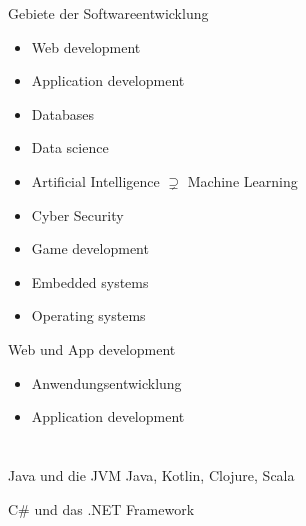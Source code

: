 \begin{frame}{Gebiete der Softwareentwicklung}
    \begin{itemize}
        \item Web development
        \item Application development
        \item Databases
        \item Data science
        \item Artificial Intelligence $\supsetneq$ Machine Learning
        \item Cyber Security
        \item Game development
        \item Embedded systems
        \item Operating systems
    \end{itemize}

\end{frame}

\begin{frame}{Web und App development}
    \begin{itemize}
        \item Anwendungsentwicklung
        \item Application development
    \end{itemize}

    \note{
        
    }
\end{frame}

\section{}


\begin{frame}{Java und die JVM}
    Java, Kotlin, Clojure, Scala

\end{frame}

\begin{frame}{C\# und das .NET Framework}

\end{frame}







